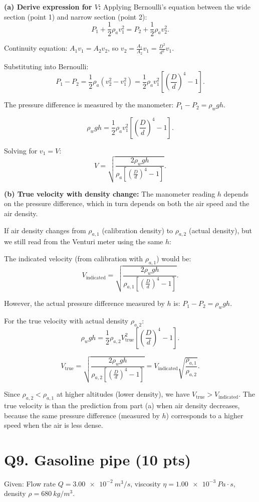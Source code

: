\documentclass[11pt]{article}
\newcommand{\ans}[1]{\boxed{\displaystyle #1}}
\begin{document}
\textbf{(a) Derive expression for $V$:} Applying Bernoulli's equation between the wide section (point 1) and narrow section (point 2):
\[ P_1 + \frac{1}{2}\rho_a v_1^2 = P_2 + \frac{1}{2}\rho_a v_2^2. \]

Continuity equation: $A_1 v_1 = A_2 v_2$, so $v_2 = \frac{A_1}{A_2} v_1 = \frac{D^2}{d^2} v_1$.

Substituting into Bernoulli:
\[ P_1 - P_2 = \frac{1}{2}\rho_a (v_2^2 - v_1^2) = \frac{1}{2}\rho_a v_1^2 \left[\left(\frac{D}{d}\right)^4 - 1\right]. \]

The pressure difference is measured by the manometer: $P_1 - P_2 = \rho_w g h$.

\[ \rho_w g h = \frac{1}{2}\rho_a v_1^2 \left[\left(\frac{D}{d}\right)^4 - 1\right]. \]

Solving for $v_1 = V$:
\[ V = \ans{\sqrt{\frac{2\rho_w g h}{\rho_a\left[\left(\frac{D}{d}\right)^4 - 1\right]}}}. \]

\textbf{(b) True velocity with density change:} The manometer reading $h$ depends on the pressure difference, which in turn depends on both the air speed and the air density.

If air density changes from $\rho_{a,1}$ (calibration density) to $\rho_{a,2}$ (actual density), but we still read from the Venturi meter using the same $h$:

The indicated velocity (from calibration with $\rho_{a,1}$) would be:
\[ V_{\text{indicated}} = \sqrt{\frac{2\rho_w g h}{\rho_{a,1}\left[\left(\frac{D}{d}\right)^4 - 1\right]}}. \]

However, the actual pressure difference measured by $h$ is: $P_1 - P_2 = \rho_w g h$.

For the true velocity with actual density $\rho_{a,2}$:
\[ \rho_w g h = \frac{1}{2}\rho_{a,2} V_{\text{true}}^2 \left[\left(\frac{D}{d}\right)^4 - 1\right]. \]

\[ V_{\text{true}} = \sqrt{\frac{2\rho_w g h}{\rho_{a,2}\left[\left(\frac{D}{d}\right)^4 - 1\right]}} = V_{\text{indicated}} \sqrt{\frac{\rho_{a,1}}{\rho_{a,2}}}. \]

Since $\rho_{a,2} < \rho_{a,1}$ at higher altitudes (lower density), we have $V_{\text{true}} > V_{\text{indicated}}$. The true velocity is \ans{larger} than the prediction from part (a) when air density decreases, because the same pressure difference (measured by $h$) corresponds to a higher speed when the air is less dense.

\section*{Q9. Gasoline pipe (10 pts)}
Given: Flow rate $Q = \SI{3.00e-2}{m^3/s}$, viscosity $\eta = \SI{1.00e-3}{Pa\cdot s}$, density $\rho = \SI{680}{kg/m^3}$.
\end{document}
